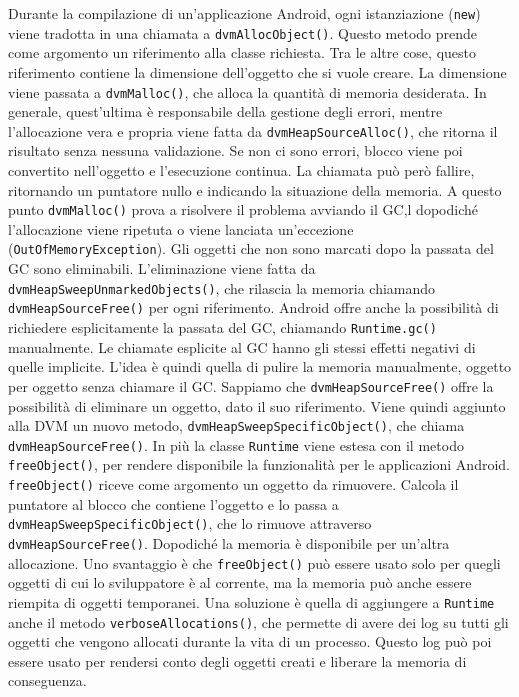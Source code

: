 Durante la compilazione di un'applicazione Android, ogni istanziazione (\texttt{new}) viene tradotta in una chiamata a \texttt{dvmAllocObject()}. Questo metodo prende come argomento un riferimento alla classe richiesta. Tra le altre cose, questo riferimento contiene la dimensione dell'oggetto che si vuole creare. La dimensione viene passata a \texttt{dvmMalloc()}, che alloca la quantità di memoria desiderata. In generale, quest'ultima è responsabile della gestione degli errori, mentre l'allocazione vera e propria viene fatta da \texttt{dvmHeapSourceAlloc()}, che ritorna il risultato senza nessuna validazione. Se non ci sono errori, blocco viene poi convertito nell'oggetto e l'esecuzione continua. La chiamata può però fallire, ritornando un puntatore nullo e indicando la situazione della memoria. A questo punto \texttt{dvmMalloc()} prova a risolvere il problema avviando il GC,l dopodiché l'allocazione viene ripetuta o viene lanciata un'eccezione (\texttt{OutOfMemoryException}). Gli oggetti che non sono marcati dopo la passata del GC sono eliminabili. L'eliminazione viene fatta da \texttt{dvmHeapSweepUnmarkedObjects()}, che rilascia la memoria chiamando \texttt{dvmHeapSourceFree()} per ogni riferimento. Android offre anche la possibilità di richiedere esplicitamente la passata del GC, chiamando \texttt{Runtime.gc()} manualmente. Le chiamate esplicite al GC hanno gli stessi effetti negativi di quelle implicite. L'idea è quindi quella di pulire la memoria manualmente, oggetto per oggetto senza chiamare il GC. Sappiamo che \texttt{dvmHeapSourceFree()} offre la possibilità di eliminare un oggetto, dato il suo riferimento. Viene quindi aggiunto alla DVM un nuovo metodo, \texttt{dvmHeapSweepSpecificObject()}, che chiama \texttt{dvmHeapSourceFree()}. In più la classe \texttt{Runtime} viene estesa con il metodo \texttt{freeObject()}, per rendere disponibile la funzionalità per le applicazioni Android. \texttt{freeObject()} riceve come argomento un oggetto da rimuovere. Calcola il puntatore al blocco che contiene l'oggetto e lo passa a \texttt{dvmHeapSweepSpecificObject()}, che lo rimuove attraverso \texttt{dvmHeapSourceFree()}. Dopodiché la memoria è disponibile per un'altra allocazione. Uno svantaggio è che \texttt{freeObject()} può essere usato solo per quegli oggetti di cui lo sviluppatore è al corrente, ma la memoria può anche essere riempita di oggetti temporanei. Una soluzione è quella di aggiungere a \texttt{Runtime} anche il metodo \texttt{verboseAllocations()}, che permette di avere dei log su tutti gli oggetti che vengono allocati durante la vita di un processo. Questo log può poi essere usato per rendersi conto degli oggetti creati e liberare la memoria di conseguenza. 

